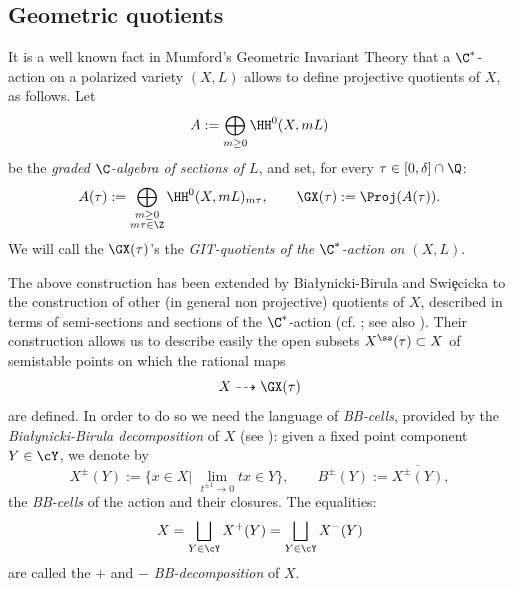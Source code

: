 \documentclass[reqno]{amsproc}
\theoremstyle{definition}
\begin{document}

\subsection{Geometric quotients}\label{wors6:sssec:quotients} It is a well known fact in Mumford's Geometric Invariant Theory that a $\C^*$-action on a polarized variety $(X,L)$  allows to define projective quotients of $X$, as follows. Let 
\[A:=\bigoplus_{m\geq 0}\HH^0(X,mL)\] 
be the {\em graded $\C$-algebra of sections of $L$}, and set, for every $\tau \in [0,\delta]\cap \Q$:
 \[A(\tau):=\bigoplus_{\substack{m\geq 0\\m\tau\in\Z}}\HH^0(X,mL)_{m\tau},\qquad \GX(\tau):=\Proj(A(\tau)).
\]
We will call the  $\GX(\tau)$'s the {\em GIT-quotients of the $\C^*$-action on $(X,L)$}.

The above construction has been extended by Bia{\l}ynicki-Birula and Swi\c{e}cicka to the construction of other (in general non projective) quotients of $X$, described in terms of semi-sections and sections of the $\C^*$-action (cf. \cite{wors6-BBS}; see also \cite{wors6-WORS3}). Their construction allows us to describe easily the open subsets $X^{\ss}(\tau)\subset X$ of semistable points on which the rational maps
$$
X\dashrightarrow \GX(\tau)
$$
are defined. 
In order to do so we need the language of {\em BB-cells}, provided by the {\em Bia{\l}ynicki-Birula decomposition} of $X$ (see \cite{wors6-BB,wors6-CARRELL}): given a fixed point component $Y\in \cY$, we denote by 
\begin{equation}\label{wors6:eq:BBcells}
X^\pm(Y):=\displaystyle\{x\in X|\,\, \lim_{t^{\pm 1}\to 0} tx\in Y\},\qquad 
B^\pm(Y):=\overline{X^\pm(Y)},
\end{equation}
the {\it BB-cells} of the action and their closures. The equalities:
\[X=\bigsqcup_{Y\in \cY}X^+(Y)=\bigsqcup_{Y\in \cY}X^-(Y)
\]
are called the {\em $+$} and {\em $-$ BB-decomposition} of $X$. 
\end{document}

